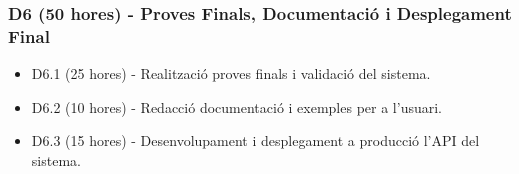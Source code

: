 \subsubsection{D6 (50 hores) - Proves Finals, Documentació i Desplegament Final}
\begin{itemize}
    \item D6.1 (25 hores) - Realització proves finals i validació del sistema.
    \item D6.2 (10 hores) - Redacció documentació i exemples per a l'usuari.
    \item D6.3 (15 hores) - Desenvolupament i desplegament a producció l'API del sistema.
\end{itemize}
